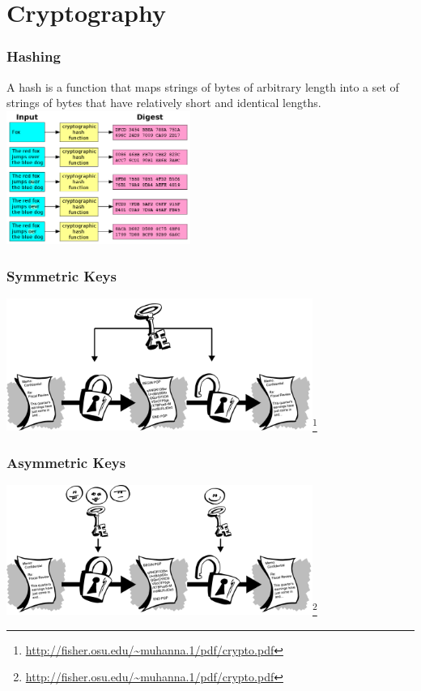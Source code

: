 \documentclass{beamer}
\begin{document}
\section{Cryptography}

\begin{frame}
\frametitle{Hashing}
\begin{multicols}{2}
  A hash is a function that maps strings of bytes of arbitrary length into a set of strings of bytes that have relatively short and identical lengths.
  \columnbreak
  \includegraphics[width=6cm]{hash.png}
\end{multicols}
\end{frame}

\begin{frame}
\frametitle{Symmetric Keys}
\begin{center}
  \includegraphics[width=10cm]{symmetric_key.png}\footnote{\url{http://fisher.osu.edu/~muhanna.1/pdf/crypto.pdf}}
\end{center}
\end{frame}

\begin{frame}
\frametitle{Asymmetric Keys}
\begin{center}
  \includegraphics[width=10cm]{asymmetric_keys.png}\footnote{\url{http://fisher.osu.edu/~muhanna.1/pdf/crypto.pdf}}
\end{center}
\end{frame}
\end{document}
